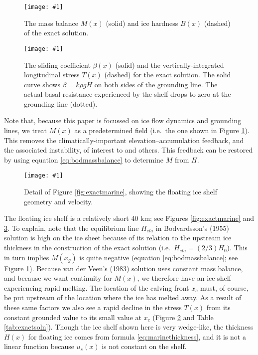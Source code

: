 \documentclass[review,letterpaper]{igs}
\newcommand{\onecol}[1]{\texttt{[image: \#1]}}
\begin{document}
\begin{figure}[ht]
\onecol{exactmarine-M-B}
\caption{The mass balance $M(x)$ (solid) and ice hardness $B(x)$ (dashed) of the exact solution.} \label{fig:exactMB}
\end{figure}

\begin{figure}[ht]
\onecol{exactmarine-beta-T}
\caption{The sliding coefficient $\beta(x)$ (solid) and the vertically-integrated longitudinal stress $T(x)$ (dashed) for the exact solution.  The solid curve shows $\beta = k \rho g H$ on both sides of the grounding line.  The actual basal resistance experienced by the shelf drops to zero at the grounding line (dotted).} \label{fig:exactbetaT}
\end{figure}

Note that, because this paper is focussed on ice flow dynamics and grounding lines, we treat $M(x)$ as a predetermined field (i.e.~the one shown in Figure \ref{fig:exactMB}).  This removes the climatically-important elevation--accumulation feedback, and the associated instability, of interest to \cite{Bodvardsson} and others.  This feedback can be restored by using equation \eqref{eq:bodmassbalance} to determine $M$ from $H$.

\begin{figure}[ht]
\onecol{exactmarine-geometry-detail}
\caption{Detail of Figure \ref{fig:exactmarine}, showing the floating ice shelf geometry and velocity.} \label{fig:exactmarine-detail}
\end{figure}

The floating ice shelf is a relatively short 40 km; see Figures \ref{fig:exactmarine} and \ref{fig:exactmarine-detail}.  To explain, note that the equilibrium line $H_{ela}$ in Bodvardsson's (1955) solution is high on the ice sheet because of its relation to the upstream ice thickness in the construction of the exact solution (i.e.~$H_{ela} = (2/3) H_0$).  This in turn implies $M(x_g)$ is quite negative (equation \eqref{eq:bodmassbalance}; see Figure \ref{fig:exactMB}).  Because van der Veen's (1983) solution uses constant mass balance, and because we want continuity for $M(x)$, we therefore have an ice shelf experiencing rapid melting.  The location of the calving front $x_c$ must, of course, be put upstream of the location where the ice has melted away.  As a result of these same factors we also see a rapid decline in the stress $T(x)$ from its constant grounded value to its small value at $x_c$ (Figure \ref{fig:exactbetaT} and Table \ref{tab:exactsoln}).  Though the ice shelf shown here is very wedge-like, the thickness $H(x)$ for floating ice comes from formula \eqref{eq:marinethickness}, and it is not a linear function because $u_s(x)$ is not constant on the shelf.
\end{document}
